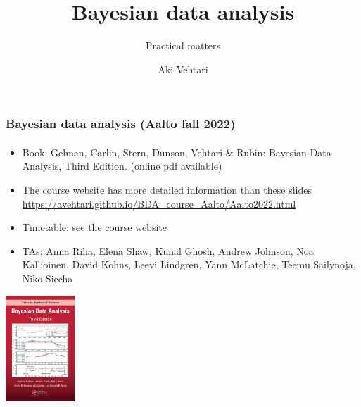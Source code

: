 \documentclass[english]{beamer}
\title[]{Bayesian data analysis}
\subtitle{Practical matters}
\author{Aki Vehtari}
\institute[Aalto University]{}
\begin{document}

\begin{frame}
  \frametitle{Bayesian data analysis (Aalto fall 2022)}  %
  \framesubtitle{}
  \begin{itemize}
  \item Book: Gelman, Carlin, Stern, Dunson, Vehtari \& Rubin: Bayesian Data
    Analysis, Third Edition. {\footnotesize (online pdf available)}
  \item The course website has more detailed information than these slides\\
    {\small\url{https://avehtari.github.io/BDA_course_Aalto/Aalto2022.html}}
  \item Timetable: see the course website
  \item TAs: Anna Riha, Elena Shaw, Kunal Ghosh, Andrew Johnson, Noa
    Kallioinen, David Kohns, Leevi Lindgren, Yann McLatchie, Teemu
    Sailynoja, Niko Siccha
    \end{itemize}
    \vspace{-0.5\baselineskip}
 \begin{center}
   \includegraphics[width=2.6cm]{figs/BDA3.jpg}
 \end{center}

\end{frame}
\end{document}
